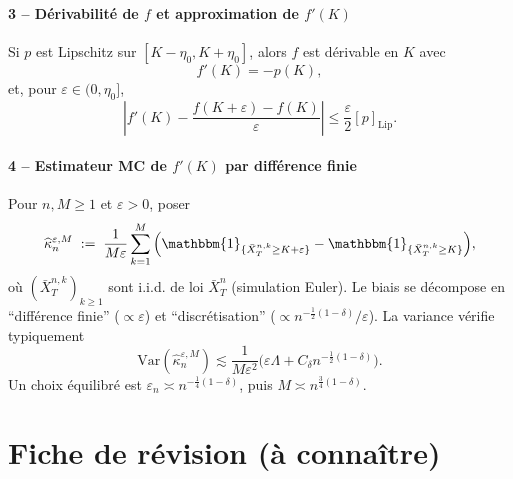 \documentclass[11pt,a4paper]{article}
\newcommand{\1}{\mathbbm{1}}
\newcommand{\Lip}{\mathrm{Lip}}
\newcommand{\Var}{\mathrm{Var}}
\theoremstyle{plain}
\theoremstyle{definition}
\begin{document}
\subsection{3 -- Dérivabilité de $f$ et approximation de $f'(K)$}
Si $p$ est Lipschitz sur $[K-\eta_0,K+\eta_0]$, alors $f$ est dérivable en $K$ avec
\[
f'(K)=-p(K),
\]
et, pour $\varepsilon\in(0,\eta_0]$,
\[
\left|f'(K)-\frac{f(K+\varepsilon)-f(K)}{\varepsilon}\right|
\le \frac{\varepsilon}{2}[p]_{\Lip}.
\]

\subsection{4 -- Estimateur MC de $f'(K)$ par différence finie}
Pour $n,M\ge 1$ et $\varepsilon>0$, poser
\[
\widehat\kappa_{n}^{\varepsilon,M}
\;:=\;\frac{1}{M\varepsilon}\sum_{k=1}^M
\Big(\1_{\{\bar X_T^{n,k}\ge K+\varepsilon\}}-\1_{\{\bar X_T^{n,k}\ge K\}}\Big),
\]
où $(\bar X_T^{n,k})_{k\ge 1}$ sont i.i.d. de loi $\bar X_T^n$ (simulation Euler).
Le biais se décompose en ``différence finie'' ($\propto \varepsilon$) et ``discrétisation'' ($\propto n^{-\frac12(1-\delta)}/\varepsilon$). La variance vérifie typiquement
\[
\Var(\widehat\kappa_{n}^{\varepsilon,M})
\lesssim \frac{1}{M\varepsilon^2}\Big(\varepsilon\Lambda+C_\delta n^{-\frac12(1-\delta)}\Big).
\]
Un choix équilibré est $\varepsilon_n\asymp n^{-\frac14(1-\delta)}$, puis $M\asymp n^{\frac34(1-\delta)}$.

\part{Fiche de révision (à connaître)}
\end{document}
